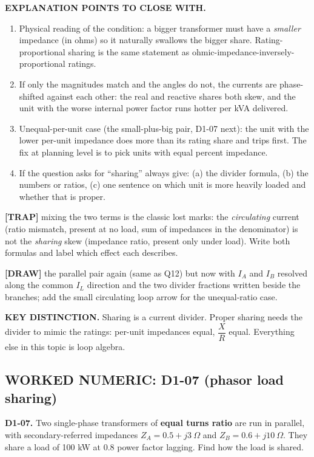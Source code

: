\documentclass[11pt]{article}
\newcommand{\tagline}[1]{\textbf{\color{copper}#1}}
\newcommand{\keydist}[1]{\vspace{2pt}\textbf{\color{red}KEY DISTINCTION.} #1}
\newcommand{\drawline}[1]{\textbf{\color{muted}[DRAW]} #1}
\newcommand{\trap}[1]{\vspace{2pt}\textbf{\color{red}[TRAP]} #1}
\begin{document}
\tagline{EXPLANATION POINTS TO CLOSE WITH.}
\begin{enumerate}[label=\arabic*.]
\item Physical reading of the condition: a bigger transformer must have a \emph{smaller} impedance (in ohms) so it naturally swallows the bigger share. Rating-proportional sharing is the same statement as ohmic-impedance-inversely-proportional ratings.
\item If only the magnitudes match and the angles do not, the currents are phase-shifted against each other: the real and reactive shares both skew, and the unit with the worse internal power factor runs hotter per kVA delivered.
\item Unequal-per-unit case (the small-plus-big pair, D1-07 next): the unit with the lower per-unit impedance does more than its rating share and trips first. The fix at planning level is to pick units with equal percent impedance.
\item If the question asks for ``sharing'' always give: (a) the divider formula, (b) the numbers or ratios, (c) one sentence on which unit is more heavily loaded and whether that is proper.
\end{enumerate}

\trap{mixing the two terms is the classic lost marks: the \emph{circulating} current (ratio mismatch, present at no load, sum of impedances in the denominator) is not the \emph{sharing} skew (impedance ratio, present only under load). Write both formulas and label which effect each describes.}

\drawline{the parallel pair again (same as Q12) but now with $I_A$ and $I_B$ resolved along the common $I_L$ direction and the two divider fractions written beside the branches; add the small circulating loop arrow for the unequal-ratio case.}

\keydist{Sharing is a current divider. Proper sharing needs the divider to mimic the ratings: per-unit impedances equal, $\dfrac{X}{R}$ equal. Everything else in this topic is loop algebra.}

\hrulefill
\subsection*{\color{copper}WORKED NUMERIC: D1-07 (phasor load sharing)}

\tagline{D1-07.} Two single-phase transformers of \textbf{equal turns ratio} are run in parallel, with secondary-referred impedances $Z_A = 0.5 + j3\ \Omega$ and $Z_B = 0.6 + j10\ \Omega$. They share a load of 100 kW at 0.8 power factor lagging. Find how the load is shared.
\end{document}
